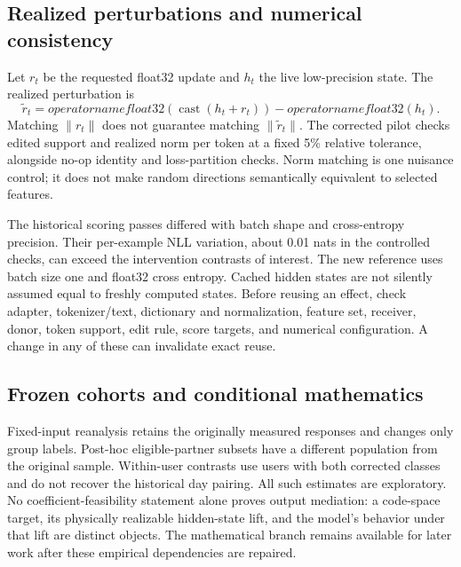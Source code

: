 \subsection{Realized perturbations and numerical consistency}
Let $r_t$ be the requested float32 update and $h_t$ the live low-precision state.
The realized perturbation is
\begin{equation}
 \widetilde r_t=operatorname{float32}
     (\operatorname{cast}(h_t+r_t))-operatorname{float32}(h_t).
\end{equation}
Matching $\|r_t\|$ does not guarantee matching $\|\widetilde r_t\|$. The corrected
pilot checks edited support and realized norm per token at a fixed 5\% relative
tolerance, alongside no-op identity and loss-partition checks. Norm matching is
one nuisance control; it does not make random directions semantically equivalent
to selected features.

The historical scoring passes differed with batch shape and cross-entropy
precision. Their per-example NLL variation, about 0.01 nats in the controlled
checks, can exceed the intervention contrasts of interest. The new reference
uses batch size one and float32 cross entropy. Cached hidden states are not
silently assumed equal to freshly computed states. Before reusing an effect,
check adapter, tokenizer/text, dictionary and normalization, feature set,
receiver, donor, token support, edit rule, score targets, and numerical
configuration. A change in any of these can invalidate exact reuse.

\subsection{Frozen cohorts and conditional mathematics}
Fixed-input reanalysis retains the originally measured responses and changes
only group labels. Post-hoc eligible-partner subsets have a different population
from the original sample. Within-user contrasts use users with both corrected
classes and do not recover the historical day pairing. All such estimates are
exploratory. No coefficient-feasibility statement alone proves output mediation:
a code-space target, its physically realizable hidden-state lift, and the model's
behavior under that lift are distinct objects. The mathematical branch remains
available for later work after these empirical dependencies are repaired.
